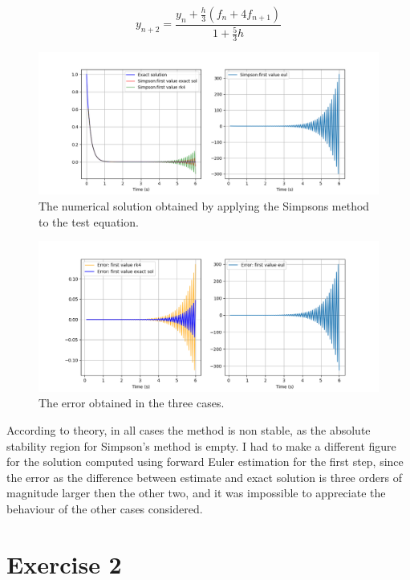 \documentclass[a4paper,12pt]{article}
\begin{document}
\begin{equation}
    y_{n+2} =\frac{y_n + \frac{h}{3} (f_n + 4f_{n+1})}{1 + \frac{5}{3}h}
\end{equation}
\begin{figure}[H]
\centering
\includegraphics[width=1\textwidth]{simpsons.png}
\caption{The numerical solution obtained by applying the Simpsons method to the test equation.}
\label{fig:simpson_solution}
\end{figure}

\begin{figure}[H]
\centering
\includegraphics[width=1\textwidth]{simpsons_error.png}
\caption{The error obtained in the three cases.}
\label{fig:simpson_error}
\end{figure}
According to theory, in all cases the method is non stable, as the absolute stability region for Simpson's method is empty.
I had to make a different figure for the solution computed using forward Euler estimation for the first step, since the error as the difference between estimate and exact solution is three orders of magnitude larger then the other two, and it was impossible to appreciate the behaviour of the other cases considered.

\section{Exercise 2}
\end{document}
